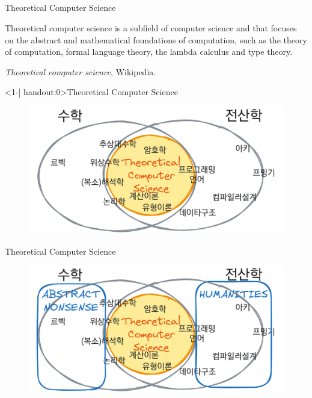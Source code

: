 \documentclass[../240513_msquare_shor.tex]{subfiles}
\begin{document}
\subsection*{}

\begin{frame}{Theoretical Computer Science}
    \begin{center}
        \begin{minipage}{.8\linewidth}
        Theoretical computer science is a subfield of computer science and  that
        focuses on the abstract and mathematical foundations of computation, such as the theory of
        computation, formal language theory, the lambda calculus and type theory.
        \end{minipage}
    \end{center}
    \hfill \textit{Theoretical computer science}, Wikipedia.
\end{frame}

\begin{frame}<1-| handout:0>{Theoretical Computer Science}
    \begin{figure}
        \centering
        \includegraphics[width=\textwidth]{images/theoretical_computer_science1.png}
    \end{figure}
\end{frame}

\begin{frame}{Theoretical Computer Science}
    \begin{figure}
        \centering
        \includegraphics[width=\textwidth]{images/theoretical_computer_science2.png}
    \end{figure}
\end{frame}
\end{document}
